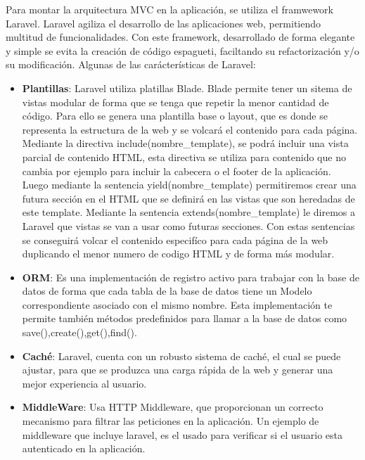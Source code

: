 \vspace{5 mm}

Para montar la arquitectura MVC en la aplicación, se utiliza el framwework Laravel. Laravel agiliza el desarrollo de las aplicaciones web, permitiendo multitud de funcionalidades. Con este framework, desarrollado de forma elegante y simple se evita la creación de código espagueti, faciltando su refactorización y/o su modificación. Algunas de las carácterísticas de Laravel: 


\begin{itemize}

\item \textbf{Plantillas}: Laravel utiliza platillas Blade. Blade permite tener un sitema de vistas modular de forma que se tenga que repetir la menor cantidad de código. Para ello se genera una plantilla base o layout, que es donde se representa la estructura de la web y se volcará el contenido para cada página. Mediante la directiva include(nombre\_template), se podrá incluir una vista parcial de contenido HTML, esta directiva se utiliza para contenido que no cambia por ejemplo para incluir la cabecera o el footer de la aplicación. Luego mediante la sentencia yield(nombre\_template) permitiremos crear una futura sección en el HTML que se definirá en las vistas que son heredadas de este template. Mediante la sentencia extends(nombre\_template) le diremos a Laravel que vistas se van a usar como futuras secciones. Con estas sentencias se conseguirá volcar el contenido especifíco para cada página de la web duplicando el menor numero de codigo HTML y de forma más modular.

\item \textbf{ORM}: Es una implementación de registro activo para trabajar con la base de datos de forma que cada tabla de la base de datos tiene un Modelo correspondiente asociado con el mismo nombre. Esta implementación te permite también métodos predefinidos para llamar a la base de datos como save(),create(),get(),find().

\item \textbf{Caché}: Laravel, cuenta con un robusto sistema de caché, el cual se puede ajustar, para que se produzca una carga rápida de la web y generar una mejor experiencia al usuario.

\item \textbf{MiddleWare}: Usa HTTP Middleware, que proporcionan un correcto mecanismo para filtrar las peticiones en la aplicación. Un ejemplo de middleware que incluye laravel, es el usado para verificar si el usuario esta autenticado en la aplicación.

\end{itemize}

